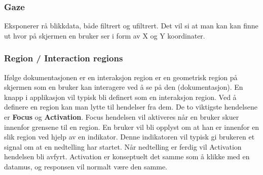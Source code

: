 \subsubsection{Gaze}
Eksponerer rå blikkdata, både filtrert og ufiltrert. Det vil si at man kan kan finne ut hvor på skjermen en bruker ser i form av X og Y koordinater.


\subsubsection{Region / Interaction regions}

Ifølge dokumentasjonen er en interaksjon region er en geometrisk region på skjermen som en bruker kan interagere ved å se på den (dokumentasjon). En knapp i applikasjon vil typisk bli definert som en interaksjon region. Ved å definere en region kan man lytte til hendelser fra dem. De to viktigste hendelsene er \textbf{Focus} og \textbf{Activation}. Focus hendelsen vil aktiveres når en bruker skuer innenfor grensene til en region. En bruker vil bli opplyst om at han er innenfor en slik region ved hjelp av en indikator. Denne indikatoren vil typisk gi brukeren et signal om at en nedtelling har startet. Når nedtelling er ferdig vil Activation hendelsen bli avfyrt. Activation er konseptuelt det samme som å klikke med en datamus, og responsen vil normalt være den samme.




